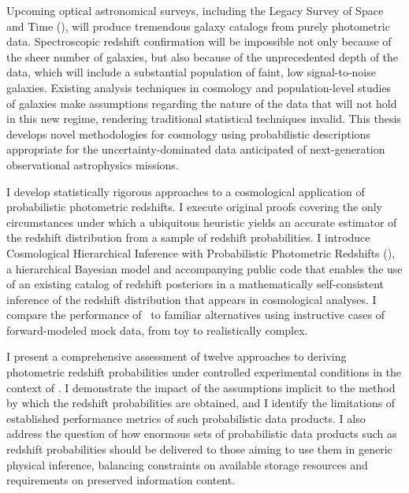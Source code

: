 Upcoming optical astronomical surveys, including the Legacy Survey of Space and Time (\lsst), will produce tremendous galaxy catalogs from purely photometric data.
Spectroscopic redshift confirmation will be impossible not only because of the sheer number of galaxies, but also because of the unprecedented depth of the data, which will include a substantial population of faint, low signal-to-noise galaxies.
Existing analysis techniques in cosmology and population-level studies of galaxies make assumptions regarding the nature of the data that will not hold in this new regime, rendering traditional statistical techniques invalid.
This thesis develops novel methodologies for cosmology using probabilistic descriptions appropriate for the uncertainty-dominated data anticipated of next-generation observational astrophysics missions. 

I develop statistically rigorous approaches to a cosmological application of probabilistic photometric redshifts.
I execute original proofs covering the only circumstances under which a ubiquitous heuristic yields an accurate estimator of the redshift distribution from a sample of redshift probabilities.
I introduce Cosmological Hierarchical Inference with Probabilistic Photometric Redshifts (\Chippr), a hierarchical Bayesian model and accompanying public code that enables the use of an existing catalog of redshift posteriors in a mathematically self-consistent inference of the redshift distribution that appears in cosmological analyses.
I compare the performance of \Chippr\ to familiar alternatives using instructive cases of forward-modeled mock data, from toy to realistically complex.

I present a comprehensive assessment of twelve approaches to deriving photometric redshift probabilities under controlled experimental conditions in the context of \lsst.
I demonstrate the impact of the assumptions implicit to the method by which the redshift probabilities are obtained, and I identify the limitations of established performance metrics of such probabilistic data products.
I also address the question of how enormous sets of probabilistic data products such as redshift probabilities should be delivered to those aiming to use them in generic physical inference, balancing constraints on available storage resources and requirements on preserved information content.


